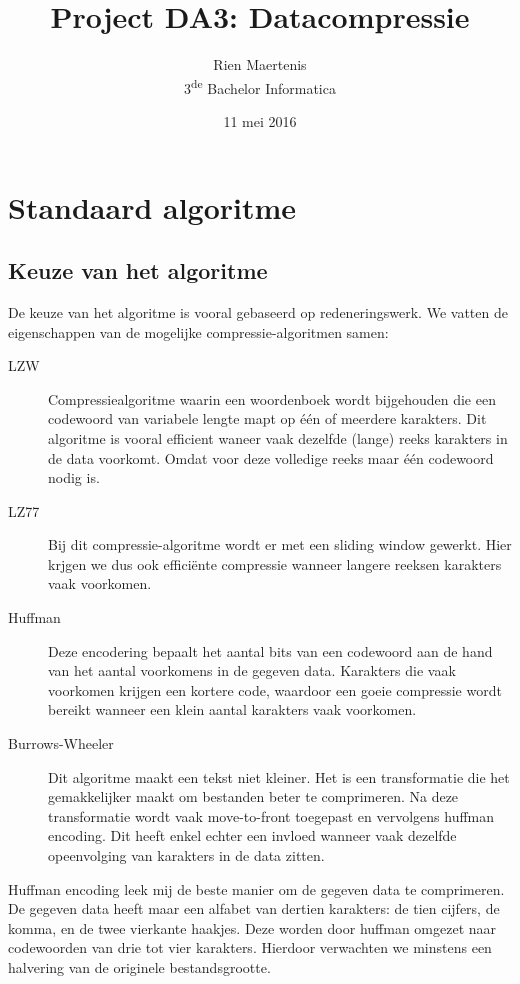 \documentclass[a4paper]{article}
\author{Rien Maertenis\\3\textsuperscript{de} Bachelor Informatica}
\title{Project DA3: Datacompressie}
\date{11 mei 2016}
\begin{document}
\maketitle

\section{Standaard algoritme}

\subsection{Keuze van het algoritme}

De keuze van het algoritme is vooral gebaseerd op redeneringswerk. We vatten de eigenschappen van de mogelijke compressie-algoritmen samen:
\begin{description}
    \item [LZW] Compressiealgoritme waarin een woordenboek wordt bijgehouden die een codewoord van variabele lengte mapt op één of meerdere karakters. Dit algoritme is vooral efficient waneer vaak dezelfde (lange) reeks karakters in de data voorkomt. Omdat voor deze volledige reeks maar één codewoord nodig is.
    \item [LZ77] Bij dit compressie-algoritme wordt er met een sliding window gewerkt. Hier krjgen we dus ook efficiënte compressie wanneer langere reeksen karakters vaak voorkomen.
    \item [Huffman] Deze encodering bepaalt het aantal bits van een codewoord aan de hand van het aantal voorkomens in de gegeven data. Karakters die vaak voorkomen krijgen een kortere code, waardoor een goeie compressie wordt bereikt wanneer een klein aantal karakters vaak voorkomen.
    \item [Burrows-Wheeler] Dit algoritme maakt een tekst niet kleiner. Het is een transformatie die het gemakkelijker maakt om bestanden beter te comprimeren. Na deze transformatie wordt vaak move-to-front toegepast en vervolgens huffman encoding. Dit heeft enkel echter een invloed wanneer vaak dezelfde opeenvolging van karakters in de data zitten.
\end{description}

Huffman encoding leek mij de beste manier om de gegeven data te comprimeren. De gegeven data heeft maar een alfabet van dertien karakters: de tien cijfers, de komma, en de twee vierkante haakjes. Deze worden door huffman omgezet naar codewoorden van drie tot vier karakters. Hierdoor verwachten we minstens een halvering van de originele bestandsgrootte.
\end{document}
